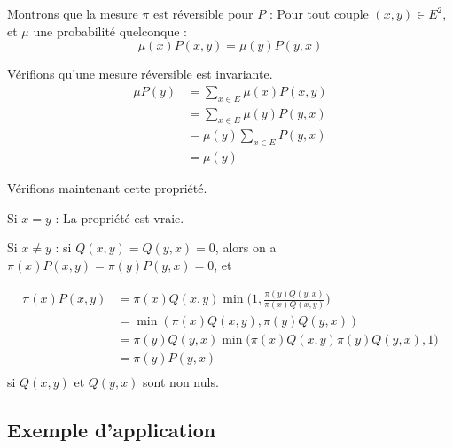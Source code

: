 \documentclass{article}
\begin{document}
\begin{tcolorbox}[colback=white,colframe=green!80!black,title=Démonstration]
    Montrons que la mesure $\pi$ est réversible pour $P$ :
    Pour tout couple $(x, y) \in E^2$, et $\mu$ une probabilité quelconque :
    $$
        \mu(x)P(x, y) = \mu(y) P(y, x)
    $$

    Vérifions qu’une mesure réversible est invariante. 
    \begin{align*}
        \mu P(y) &= \sum_{x \in E}{\mu(x) P(x, y)}\\
        &= \sum_{x \in E}{\mu(y) P(y, x)}\\
        &= \mu(y) \sum_{x \in E}{P(y, x)}\\
        &= \mu(y)
    \end{align*}

    Vérifions maintenant cette propriété.

    Si $x = y$ : La propriété est vraie.

    Si $x \neq y$ :
    si $Q(x, y) = Q(y, x) = 0$, alors on a $\pi(x)P(x, y) = \pi(y)P(y, x) = 0$, et

    \begin{align*}
        \pi(x)P(x, y) &= \pi(x)Q(x, y)\min\Big(1, \frac{\pi(y)Q(y, x)}{\pi(x)Q(x, y)}\Big)\\
        &= \min(\pi(x)Q(x, y), \pi(y)Q(y, x))\\
        &= \pi(y)Q(y, x )\min\Big(\pi(x)Q(x, y)\pi(y)Q(y, x), 1)\\
        &= \pi(y)P(y, x)\\
    \end{align*}
    si $Q(x, y)$ et $Q(y, x)$ sont non nuls.
\end{tcolorbox}

\subsection{Exemple d'application}
\end{document}
